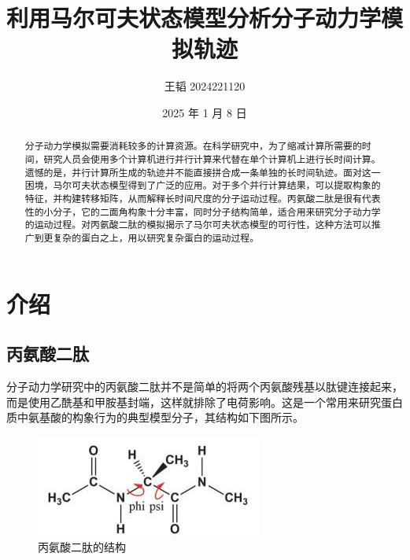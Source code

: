 \documentclass[a4paper]{article}
\title{利用马尔可夫状态模型分析分子动力学模拟轨迹}                   %
\author{王韬 2024221120}
\date{2025 年 1 月 8 日}
\begin{document}
	
\begin{CJK}{UTF8}{gbsn}
\maketitle

\begin{center}
\tableofcontents
\end{center}

\newpage

 \begin{abstract}

分子动力学模拟需要消耗较多的计算资源。在科学研究中，为了缩减计算所需要的时间，研究人员会使用多个计算机进行并行计算来代替在单个计算机上进行长时间计算。遗憾的是，并行计算所生成的轨迹并不能直接拼合成一条单独的长时间轨迹。面对这一困境，马尔可夫状态模型得到了广泛的应用。对于多个并行计算结果，可以提取构象的特征，并构建转移矩阵，从而解释长时间尺度的分子运动过程。丙氨酸二肽是很有代表性的小分子，它的二面角构象十分丰富，同时分子结构简单，适合用来研究分子动力学的运动过程。对丙氨酸二肽的模拟揭示了马尔可夫状态模型的可行性，这种方法可以推广到更复杂的蛋白之上，用以研究复杂蛋白的运动过程。

 \end{abstract}

\newpage


\section{介绍}
	\subsection{丙氨酸二肽}

	分子动力学研究中的丙氨酸二肽并不是简单的将两个丙氨酸残基以肽键连接起来，而是使用乙酰基和甲胺基封端，这样就排除了电荷影响。这是一个常用来研究蛋白质中氨基酸的构象行为的典型模型分子，其结构如下图所示。

\begin{figure}[H]
\centering
\includegraphics[scale=0.35]{ala_di.jpg}
\caption{丙氨酸二肽的结构}
\end{figure}


\end{CJK}
\end{document}
